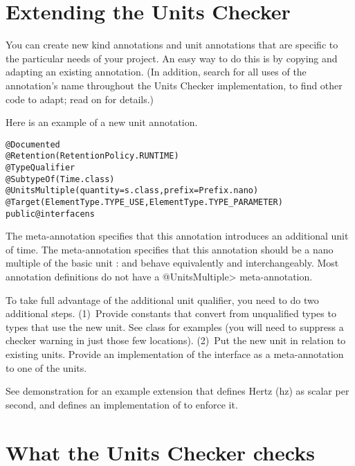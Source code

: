 \section{Extending the Units Checker\label{extending-units}}

You can create new kind annotations and unit annotations that are specific
to the particular needs of your project.  An easy way to do this is by
copying and adapting an existing annotation.  (In addition, search for all
uses of the annotation's name throughout the Units Checker implementation,
to find other code to adapt; read on for details.)

Here is an example of a new unit annotation.

\begin{alltt}
@Documented
@Retention(RetentionPolicy.RUNTIME)
@TypeQualifier
@SubtypeOf( \ttlcb{} Time.class \ttrcb{} )
@UnitsMultiple(quantity=s.class, prefix=Prefix.nano)
@Target({ElementType.TYPE_USE, ElementType.TYPE_PARAMETER})
public @interface ns \ttlcb{}\ttrcb{}
\end{alltt}

The  meta-annotation specifies that this annotation
introduces an additional unit of time.
The  meta-annotation specifies that this annotation
should be a nano multiple of the basic unit :   and
behave equivalently and interchangeably.
Most annotation definitions do not have a \<@UnitsMultiple> meta-annotation.


To take full advantage of the additional unit qualifier, you need to
do two additional steps.
(1)~Provide constants that convert from unqualified types to types that use
the new unit.  
See class  for examples (you will need to suppress a
checker warning in just those few locations).
(2)~Put the new unit in relation to existing units.
Provide an
implementation of the  interface as a
meta-annotation to one of the units.

See demonstration  for an example
extension that defines Hertz (hz) as scalar per second, and defines an
implementation of  to enforce it.



\section{What the Units Checker checks\label{units-checks}}

